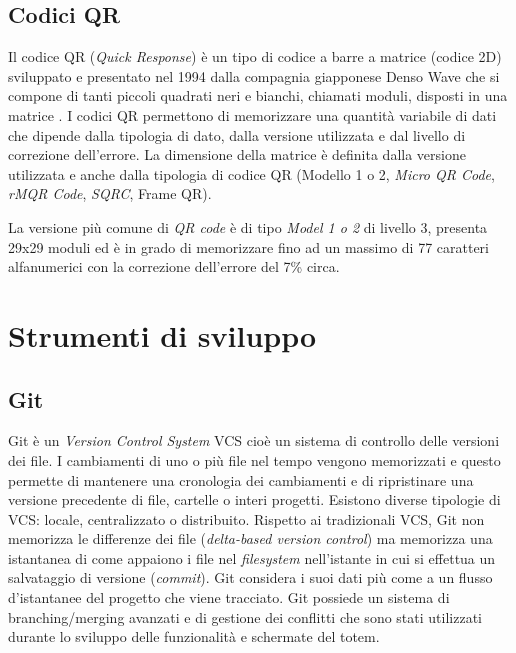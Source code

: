%
\subsection{Codici QR}
Il codice QR (\textit{Quick Response}) è un tipo di codice a barre a matrice (codice 2D) sviluppato e presentato nel 1994 dalla compagnia giapponese Denso Wave che si compone di tanti piccoli quadrati neri e bianchi, chiamati moduli, disposti in una matrice \cite{qrCodeDensoWave}.
I codici QR permettono di memorizzare una quantità variabile di dati che dipende dalla tipologia di dato, dalla versione utilizzata e dal livello di correzione dell'errore. La dimensione della matrice è definita dalla versione utilizzata e anche dalla tipologia di codice QR (Modello 1 o 2, \textit{Micro QR Code}, \textit{rMQR Code}, \textit{SQRC}, Frame QR).

La versione più comune di \textit{QR code} è di tipo \textit{Model 1 o 2} di livello 3, presenta 29x29 moduli ed è in grado di memorizzare fino ad un massimo di 77 caratteri alfanumerici con la correzione dell'errore del 7\% circa.

\section{Strumenti di sviluppo}
\subsection{Git}
Git \cite{gitSite} è un \textit{Version Control System} VCS cioè un sistema di controllo delle versioni dei file. I cambiamenti di uno o più file nel tempo vengono memorizzati e questo permette di mantenere una cronologia dei cambiamenti e di ripristinare una versione precedente di file, cartelle o interi progetti. Esistono diverse tipologie di VCS: locale, centralizzato o distribuito.
Rispetto ai tradizionali VCS, Git non memorizza le differenze dei file (\textit{delta-based version control}) ma memorizza una istantanea di come appaiono i file nel \textit{filesystem} nell'istante in cui si effettua un salvataggio di versione (\textit{commit}). Git considera i suoi dati più come a un flusso d'istantanee del progetto che viene tracciato. Git possiede un sistema di branching/merging avanzati e di gestione dei conflitti che sono stati utilizzati durante lo sviluppo delle funzionalità e schermate del totem.

